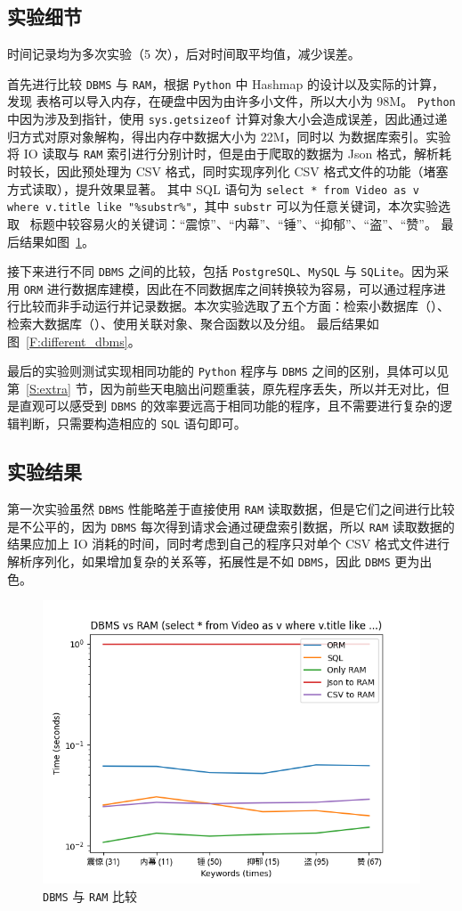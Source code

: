\subsection{实验细节}
时间记录均为多次实验（5 次），后对时间取平均值，减少误差。

首先进行比较 \texttt{DBMS} 与 \texttt{RAM}，根据 \texttt{Python} 中 Hashmap 的设计\cite{python2010rees}以及实际的计算，发现  表格可以导入内存，在硬盘中因为由许多小文件，所以大小为 98M。
\texttt{Python} 中因为涉及到指针，使用 \texttt{sys.getsizeof} 计算对象大小会造成误差，因此通过递归方式对原对象解构，得出内存中数据大小为 22M，同时以  为数据库索引。实验将 IO 读取与 \texttt{RAM} 索引进行分别计时，但是由于爬取的数据为 Json 格式，解析耗时较长，因此预处理为 CSV 格式，同时实现序列化 CSV 格式文件的功能（堵塞方式读取），提升效果显著。
其中 SQL 语句为 \texttt{select * from Video as v where v.title like "\%substr\%"}，其中 \texttt{substr} 可以为任意关键词，本次实验选取 \bilibili\ 标题中较容易火的关键词：“震惊”、“内幕”、“锤”、“抑郁”、“盗”、“赞”。
最后结果如图~\ref{F:dbms_vs_ram}。

接下来进行不同 \texttt{DBMS} 之间的比较，包括 \texttt{PostgreSQL}、\texttt{MySQL} 与 \texttt{SQLite}。因为采用 \texttt{ORM} 进行数据库建模，因此在不同数据库之间转换较为容易，可以通过程序进行比较而非手动运行并记录数据。本次实验选取了五个方面：检索小数据库（）、检索大数据库（）、使用关联对象、聚合函数以及分组。
最后结果如图~\ref{F:different_dbms}。

最后的实验则测试实现相同功能的 \texttt{Python} 程序与 \texttt{DBMS} 之间的区别，具体可以见第~\ref{S:extra} 节，因为前些天电脑出问题重装，原先程序丢失，所以并无对比，但是直观可以感受到 \texttt{DBMS} 的效率要远高于相同功能的程序，且不需要进行复杂的逻辑判断，只需要构造相应的 \texttt{SQL} 语句即可。


\subsection{实验结果}
第一次实验虽然 \texttt{DBMS} 性能略差于直接使用 \texttt{RAM} 读取数据，但是它们之间进行比较是不公平的，因为 \texttt{DBMS} 每次得到请求会通过硬盘索引数据，所以 \texttt{RAM} 读取数据的结果应加上 IO 消耗的时间，同时考虑到自己的程序只对单个 CSV 格式文件进行解析序列化，如果增加复杂的关系等，拓展性是不如 \texttt{DBMS}，因此 \texttt{DBMS} 更为出色。
\begin{figure}[H]
    \centering
    \includegraphics[width=.5\textwidth]{code/plot/dbms_vs_ram.png}
    \caption{\texttt{DBMS} 与 \texttt{RAM} 比较}\label{F:dbms_vs_ram}
\end{figure}

